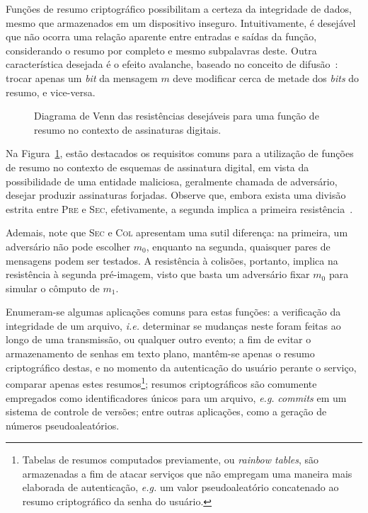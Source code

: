 \documentclass{ufsctex/ufsctex}
\begin{document}
Funções de resumo criptográfico possibilitam a certeza da integridade de dados,
mesmo que armazenados em um dispositivo inseguro. Intuitivamente, é desejável
que não ocorra uma relação aparente entre entradas e saídas da função,
considerando o resumo por completo e mesmo subpalavras deste. Outra
característica desejada é o efeito avalanche, baseado no conceito de
difusão~\cite[pp. 72]{Stallings:book:2010}: trocar apenas um \emph{bit} da
mensagem $m$ deve modificar cerca de metade dos \emph{bits} do resumo, e
vice-versa.

\begin{figure}
  \centering
  \caption{Diagrama de Venn das resistências desejáveis para uma função de
    resumo no contexto de assinaturas digitais.}\label{fig:venn}
\end{figure}

Na Figura~\ref{fig:venn}, estão destacados os requisitos comuns para a
utilização de funções de resumo no contexto de esquemas de assinatura digital,
em vista da possibilidade de uma entidade maliciosa, geralmente chamada de
adversário, desejar produzir assinaturas forjadas. Observe que, embora exista
uma divisão estrita entre \textsc{Pre} e \textsc{Sec}, efetivamente, a segunda
implica a primeira resistência~\cite[Nota 9.20]{Menezes:book:1996}.

Ademais, note que \textsc{Sec} e \textsc{Col} apresentam uma sutil diferença:
na primeira, um adversário não pode escolher $m_{0}$, enquanto na segunda,
quaisquer pares de mensagens podem ser testados. A resistência à colisões,
portanto, implica na resistência à segunda pré-imagem, visto que basta um
adversário fixar $m_{0}$ para simular o cômputo de $m_{1}$.

Enumeram-se algumas aplicações comuns para estas funções: a verificação da
integridade de um arquivo, \emph{i.e.} determinar se mudanças neste foram
feitas ao longo de uma transmissão, ou qualquer outro evento; a fim de evitar o
armazenamento de senhas em texto plano, mantêm-se apenas o resumo criptográfico
destas, e no momento da autenticação do usuário perante o serviço, comparar
apenas estes resumos\footnote{Tabelas de resumos computados previamente, ou
\emph{rainbow tables}, são armazenadas a fim de atacar serviços que não
empregam uma maneira mais elaborada de autenticação, \emph{e.g.} um valor
pseudoaleatório concatenado ao resumo criptográfico da senha do usuário.};
resumos criptográficos são comumente empregados como identificadores únicos
para um arquivo, \emph{e.g.} \emph{commits} em um sistema de controle de
versões; entre outras aplicações, como a geração de números pseudoaleatórios.
\end{document}
